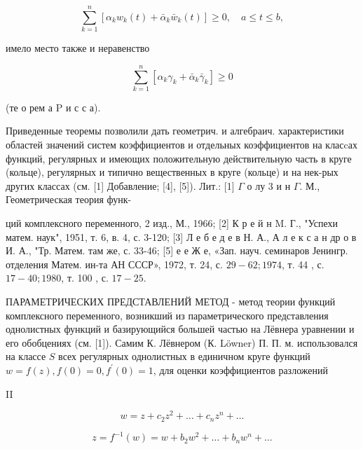 \documentclass[10pt]{article}
\begin{document}
\[

\sum_{k=1}^{n}\left[\alpha_{k} w_{k}(t)+\bar{\alpha}_{k} \bar{w}_{k}(t)\right] \geqslant 0, \quad a \leqslant t \leqslant b,

\]



имело место также и неравенство



\[

\sum_{k=1}^{n}\left[\alpha_{k} \gamma_{k}+\bar{\alpha}_{k} \bar{\gamma}_{k}\right] \geqslant 0

\]



(те о рем а $\mathrm{P}$ и с с а).



Приведенные теоремы позволили дать геометрич. и алгебраич. характеристики областей значений систем коэффициентов и отдельных коэффициентов на класcах функций, регулярных и имеющих положительную действительную часть в круге (кольце), регулярных и типично вещественных в круге (кольце) и на нек-рых других классах (см. [1] Добавление; [4], [5]). Лит.: [1] $\Gamma$ о лу 3 и н $\Gamma$. М., Геометрическая теория функ-

ций комплексного переменного, 2 изд., М., 1966; [2] К р е й н M. Г., "Успехи матем. наук", 1951, т. 6, в. 4, с. 3-120; [3] Л е б е д е в Н. А., А л е к с а н др о в И. А., "Тр. Матем. там же, с. 33-46; [5] е е Ж е, «Зап. науч. семинаров Јенингр. отделения Матем. ин-та АН СССР», 1972, т. 24, с. $29-62 ; 1974$, т. 44 , с. $17-40 ; 1980$, т. 100 , с. $17-25$.



ПАРАМЕТРИЧЕСКИХ ПРЕДСТАВЛЕНИЙ МЕТОД - метод теории функций комплексного переменного, возникший из параметрического представления однолистных функций и базирующийся большей частью на Лёвнера уравнении и его обобцениях (см. [1]). Самим К. Лёвнером (К. Löwner) П. П. м. использовался на классе $S$ всех регулярных однолистных в единичном круге функций $w=f(z), f(0)=0, f^{\prime}(0)=1$, для оценки коэффициентов разложений



II



\[

w=z+c_{2} z^{2}+\ldots+c_{n} z^{n}+\ldots

\]



\[

z=f^{-1}(w)=w+b_{2} w^{2}+\ldots+b_{n} w^{n}+\ldots

\]
\end{document}
